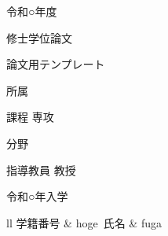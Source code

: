 \documentclass[main]{subfiles}
\begin{document}
\begin{titlepage}
    \centeringing

    {\Huge 令和○年度}
    \vspace{15truept}

    {\Huge 修士学位論文}
    \vspace*{60truept}

    {\Huge 論文用テンプレート}
    \vspace{60truept}

    {\Huge 所属}
    \vspace{15truept}

    {\Huge 課程 専攻}
    \vspace{15truept}

    {\Huge 分野}
    \vspace{60truept}

    {\Huge 指導教員 教授}
    \vspace{60truept}

    {\Huge 令和○年入学}
    \vspace{15truept}

    \Huge
    \begin{tabular}{ll}
        学籍番号 & hoge\Huge\
        氏名   & fuga\Huge\
    \end{tabular}

\end{titlepage}
\end{document}
